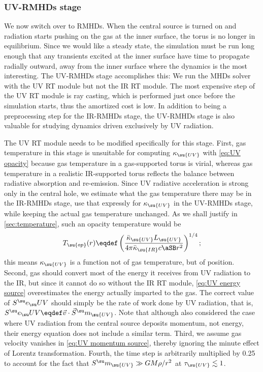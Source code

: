 \documentclass[twocolumn]{article}
\newcommand*\uvrmhd{\ac{UV}\protect\nobreakdash-\acp{RMHD}}
\newcommand*\irrmhd{\ac{IR}\protect\nobreakdash-\acp{RMHD}}
\newcommand*\titleuvrmhd{\texorpdfstring
  {\acs*{UV}\protect\nobreakdash-\acsp*{RMHD}}{UV-RMHD}}
\newcommand*\momsrc[1]{\vec S^\su m_\su{#1}}
\newcommand*\momsrcmag[1]{S^\su m_\su{#1}}
\begin{document}
\subsubsection{\titleuvrmhd{} stage}
\label{sec:UV-RMHD stage}

We now switch over to \acp{RMHD}. When the central source is turned on and
radiation starts pushing on the gas at the inner surface, the torus is no
longer in equilibrium. Since we would like a steady state, the simulation must
be run long enough that any transients excited at the inner surface have time
to propagate radially outward, away from the inner surface where the dynamics
is the most interesting. The \uvrmhd{} stage accomplishes this: We run the
\acp{MHD} solver with the \ac{UV} \ac{RT} module but not the \ac{IR} \ac{RT}
module. The most expensive step of the \ac{UV} \ac{RT} module is ray casting,
which is performed just once before the simulation starts, thus the amortized
cost is low. In addition to being a preprocessing step for the \irrmhd{} stage,
the \uvrmhd{} stage is also valuable for studying dynamics driven exclusively
by \ac{UV} radiation.

The \ac{UV} \ac{RT} module needs to be modified specifically for this stage.
First, gas temperature in this stage is unsuitable for computing
$\kappa_\su{UV}$ with \cref{eq:UV opacity} because gas temperature in a
gas-supported torus is virial, whereas gas temperature in a realistic
\ac{IR}-supported torus reflects the balance between radiative absorption and
re-emission. Since \ac{UV} radiative acceleration is strong only in the central
hole, we estimate what the gas temperature there may be in the \irrmhd{} stage,
use that expressly for $\kappa_\su{UV}$ in the \uvrmhd{} stage, while keeping
the actual gas temperature unchanged. As we shall justify in
\cref{sec:temperature}, such an opacity temperature would be
\begin{equation}\label{eq:opacity temperature}
T_\su{op}(r)\eqdef\left(\frac{\bar\kappa_\su{UV}L_\su{UV}}
  {4\pi\bar\kappa_\su{IR}c\aSB r^2}\right)^{1/4};
\end{equation}
this means $\kappa_\su{UV}$ is a function not of gas temperature, but of
position. Second, gas should convert most of the energy it receives from
\ac{UV} radiation to the \ac{IR}, but since it cannot do so without the \ac{IR}
\ac{RT} module, \cref{eq:UV energy source} overestimates the energy actually
imparted to the gas. The correct value of $\ergsrc{UV}$ should simply be the
rate of work done by \ac{UV} radiation, that is, $\ergsrc{UV}\eqdef\vec
v\cdot\momsrc{UV}$. Note that although \citet{2012ApJ...758...66W} also
considered the case where \ac{UV} radiation from the central source deposits
momentum, not energy, their energy equation does not include a similar term.
Third, we assume gas velocity vanishes in \cref{eq:UV momentum source}, thereby
ignoring the minute effect of Lorentz transformation. Fourth, the time step is
arbitrarily multiplied by 0.25 to account for the fact that $\momsrcmag{UV}\gg
GM\rho/r^2$ at $\tau_\su{UV}\lesssim1$.
\end{document}
